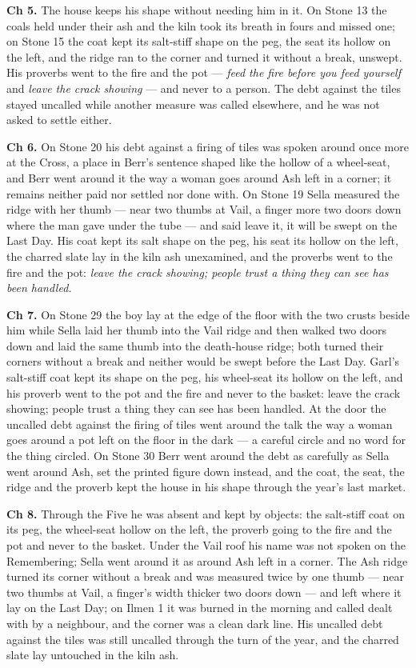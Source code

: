 \documentclass{design/chronicle}
\begin{document}
{\textbf{Ch 5.} The house keeps his shape without needing him in it. On Stone 13 the coals held under their ash and the kiln took its breath in fours and missed one; on Stone 15 the coat kept its salt-stiff shape on the peg, the seat its hollow on the left, and the ridge ran to the corner and turned it without a break, unswept. His proverbs went to the fire and the pot --- \emph{feed the fire before you feed yourself} and \emph{leave the crack showing} --- and never to a person. The debt against the tiles stayed uncalled while another measure was called elsewhere, and he was not asked to settle either.

\textbf{Ch 6.} On Stone 20 his debt against a firing of tiles was spoken around once more at the Cross, a place in Berr’s sentence shaped like the hollow of a wheel-seat, and Berr went around it the way a woman goes around Ash left in a corner; it remains neither paid nor settled nor done with. On Stone 19 Sella measured the ridge with her thumb --- near two thumbs at Vail, a finger more two doors down where the man gave under the tube --- and said leave it, it will be swept on the Last Day. His coat kept its salt shape on the peg, his seat its hollow on the left, the charred slate lay in the kiln ash unexamined, and the proverbs went to the fire and the pot: \emph{leave the crack showing; people trust a thing they can see has been handled.}

\textbf{Ch 7.} On Stone 29 the boy lay at the edge of the floor with the two crusts beside him while Sella laid her thumb into the Vail ridge and then walked two doors down and laid the same thumb into the death-house ridge; both turned their corners without a break and neither would be swept before the Last Day. Garl’s salt-stiff coat kept its shape on the peg, his wheel-seat its hollow on the left, and his proverb went to the pot and the fire and never to the basket: leave the crack showing; people trust a thing they can see has been handled. At the door the uncalled debt against the firing of tiles went around the talk the way a woman goes around a pot left on the floor in the dark --- a careful circle and no word for the thing circled. On Stone 30 Berr went around the debt as carefully as Sella went around Ash, set the printed figure down instead, and the coat, the seat, the ridge and the proverb kept the house in his shape through the year’s last market.

\textbf{Ch 8.} Through the Five he was absent and kept by objects: the salt-stiff coat on its peg, the wheel-seat hollow on the left, the proverb going to the fire and the pot and never to the basket. Under the Vail roof his name was not spoken on the Remembering; Sella went around it as around Ash left in a corner. The Ash ridge turned its corner without a break and was measured twice by one thumb --- near two thumbs at Vail, a finger’s width thicker two doors down --- and left where it lay on the Last Day; on Ilmen 1 it was burned in the morning and called dealt with by a neighbour, and the corner was a clean dark line. His uncalled debt against the tiles was still uncalled through the turn of the year, and the charred slate lay untouched in the kiln ash.

}
\end{document}

